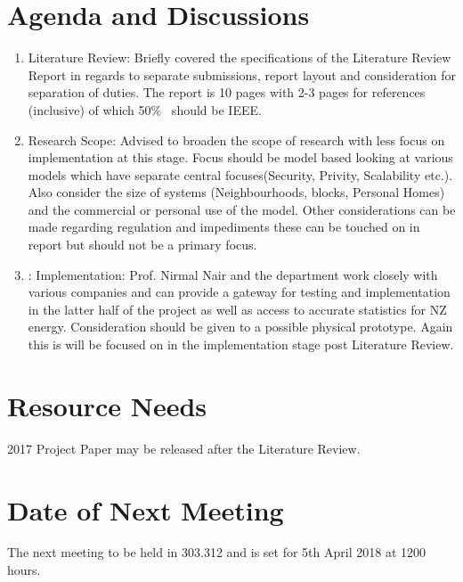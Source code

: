 \documentclass[a4paper,12pt]{article}
\begin{document}
\section{Agenda and Discussions}
\begin{enumerate}
    \item Literature Review: Briefly covered the specifications of the Literature Review Report in regards to separate submissions, report layout and consideration for separation of duties. The report is 10 pages with 2-3 pages for references (inclusive) of which 50\%~ should be IEEE.   
    \item Research Scope: Advised to broaden the scope of research with less focus on implementation at this stage. Focus should be model based looking at various models which have separate central focuses(Security, Privity, Scalability etc.). Also consider the size of systems (Neighbourhoods, blocks, Personal Homes) and the commercial or personal use of the model. Other considerations can be made regarding regulation and impediments these can be touched on in report but should not be a primary focus.  
    \item : Implementation: Prof. Nirmal Nair and the department work closely with various companies and can provide a gateway for testing and implementation in the latter half of the project as well as access to accurate statistics for NZ energy. Consideration should be given to a possible physical prototype. Again this is will be focused on in the implementation stage post Literature Review. 
\end{enumerate}

\section{Resource Needs}
2017 Project Paper may be released after the Literature Review. 

\section{Date of Next Meeting}
The next meeting to be held in 303.312 and is set for 5th April 2018 at 1200 hours.
\end{document}
